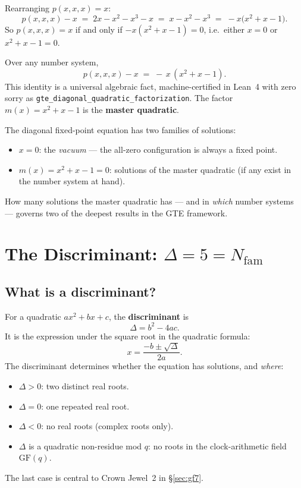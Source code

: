\documentclass[11pt,a4paper]{article}
\newcommand{\term}[1]{\textbf{#1}}
\newcommand{\Nfam}{N_{\mathrm{fam}}}
\newcommand{\lean}[1]{\texttt{#1}}
\begin{document}
Rearranging $p(x,x,x) = x$:
\[
  p(x,x,x) - x
  \;=\; 2x - x^2 - x^3 - x
  \;=\; x - x^2 - x^3
  \;=\; -x\bigl(x^2 + x - 1\bigr).
\]
So $p(x,x,x) = x$ if and only if $-x(x^2 + x - 1) = 0$, i.e.\ either
$x = 0$ or $x^2 + x - 1 = 0$.

\begin{tcolorbox}[colback=boxgreen,colframe=green!50!black,
  title=The universal diagonal factorization (machine-certified)]
Over any number system,
\[
  \boxed{p(x,x,x) - x \;=\; -\,x\,(x^2 + x - 1).}
\]
This identity is a universal algebraic fact, machine-certified in Lean~4
with zero sorry as \lean{gte\_diagonal\_quadratic\_factorization}.
The factor $m(x) = x^2 + x - 1$ is the \term{master quadratic}.
\end{tcolorbox}

The diagonal fixed-point equation has two families of solutions:
\begin{itemize}[itemsep=2pt]
  \item $x = 0$: the \emph{vacuum} — the all-zero configuration is always a fixed point.
  \item $m(x) = x^2 + x - 1 = 0$: solutions of the master quadratic (if any exist
    in the number system at hand).
\end{itemize}

How many solutions the master quadratic has — and in \emph{which} number systems —
governs two of the deepest results in the GTE framework.

\section{The Discriminant: \texorpdfstring{$\Delta = 5 = \Nfam$}{disc = 5 = N\_fam}}

\subsection{What is a discriminant?}

For a quadratic $ax^2 + bx + c$, the \term{discriminant} is
\[
  \Delta = b^2 - 4ac.
\]
It is the expression under the square root in the quadratic formula:
\[
  x = \frac{-b \pm \sqrt{\Delta}}{2a}.
\]
The discriminant determines whether the equation has solutions, and \emph{where}:
\begin{itemize}[itemsep=2pt]
  \item $\Delta > 0$: two distinct real roots.
  \item $\Delta = 0$: one repeated real root.
  \item $\Delta < 0$: no real roots (complex roots only).
  \item $\Delta$ is a quadratic non-residue mod $q$: no roots in the clock-arithmetic
    field $\mathrm{GF}(q)$.
\end{itemize}
The last case is central to Crown Jewel~2 in §\ref{sec:gf7}.
\end{document}
